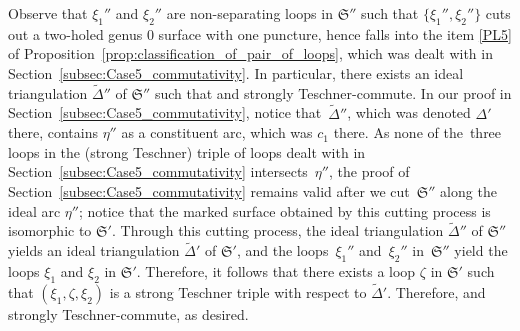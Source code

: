 \documentclass[10pt,a4paper]{amsart}
\numberwithin{equation}{section}
\theoremstyle{definition}
\newcommand{\til}[1]{\widetilde{#1}}
\begin{document}
Observe that $\xi_1''$ and $\xi_2''$ are non-separating loops in $\mathfrak{S}''$ such that $\{\xi_1'',\xi_2''\}$ cuts out a two-holed genus $0$ surface with one puncture, hence falls into the item \ref{PL5} of Proposition~\ref{prop:classification_of_pair_of_loops}, which was dealt with in Section~\ref{subsec:Case5_commutativity}. In particular, there exists an ideal triangulation $\widetilde{\Delta}''$ of $\mathfrak{S}''$ such that  and  strongly Teschner-commute. In our proof in Section~\ref{subsec:Case5_commutativity}, notice that~$\til{\Delta}''$, which was denoted $\Delta'$ there, contains $\eta''$ as a constituent arc, which was $c_1$ there. As none of the~three loops in the (strong Teschner) triple of loops dealt with in Section~\ref{subsec:Case5_commutativity} intersects~$\eta''$, the proof of Section~\ref{subsec:Case5_commutativity} remains valid after we cut~$\mathfrak{S}''$ along the ideal arc $\eta''$; notice that the marked surface obtained by this cutting process is isomorphic to $\mathfrak{S}'$. Through this cutting process, the ideal triangulation $\til{\Delta}''$ of $\mathfrak{S}''$ yields an ideal triangulation $\til{\Delta}'$ of $\mathfrak{S}'$, and the loops~$\xi_1''$ and~$\xi_2''$ in~$\mathfrak{S}''$ yield the loops $\xi_1$ and $\xi_2$ in $\mathfrak{S}'$. Therefore, it follows that there exists a loop $\zeta$ in $\mathfrak{S}'$ such that $(\xi_1,\zeta,\xi_2)$ is a strong Teschner triple with respect to $\til{\Delta}'$. Therefore, \smash{$f^\omega_{[\xi_1],\til{\Delta}'}$} and \smash{$f^\omega_{[\xi_2],\til{\Delta}'}$} strongly Teschner-commute, as desired.
\end{document}
